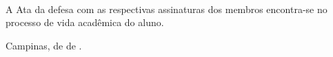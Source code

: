 {\begin{emptyenv}
\begin{center}
\begin{flushleft}
            \vspace{0.6cm}
            \hrulefill\\
            \textbf{\Wexamt\\ \Wexamtinst }\\
            
            \vspace{0.6cm}
            A Ata da defesa com as respectivas assinaturas dos membros encontra-se no processo de vida acadêmica do aluno.
        \end{flushleft}
        \begin{flushright}
            \vspace{1.2cm}
            Campinas, \Wdegreeday de \Wdegreemonth de \Wdegreeyear.
    \end{flushright}
    \end{center}
\end{emptyenv}
}

\newcommand{\maketablecontents}{
\begin{listsenv}
    \tableofcontents
\end{listsenv}
}

\newcommand{\makelistfigures}{
\begin{listsenv}
    \listoffigures
\end{listsenv}
\thispagestyle{empty}
}

\newcommand{\makelistables}{
\begin{listsenv}
    \listoftables
\end{listsenv}
\thispagestyle{empty}
}

\newcommand{\printnomencl}{
  \begin{listsenv}
    \ifenglish
      \needspace{20em}
      \printnomenclature
    \else
        \needspace{20em}
        \renewcommand{\nomname}{Lista de Abreviaturas e Siglas}
        \printnomenclature
    \fi
  \end{listsenv}
}

\newcommand{\printbib}{
\begin{bibenv}
    \printbibliography[heading=bibintoc]
\end{bibenv}
}


\newcommand{\makelibrarycatalog}{
    \begin{emptyenv}
        \clearpage
        \ifdefempty{\Wlibcatalog}{
            \begin{center}
                FICHA CATALOGRÁFICA ELABORADA PELA \\
                BIBLIOTECA DA ÁREA DE ENGENHARIA E ARQUITETURA - BAE - UNICAMP \\
            \end{center}
        }{
            
        }
    \end{emptyenv}
}

